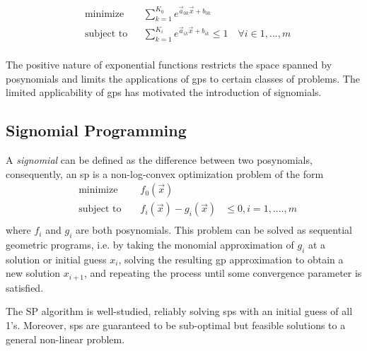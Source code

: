 \begin{equation}
\begin{aligned}
& \text{minimize} && \textstyle{\sum}_{k=1}^{K_0}e^{\vec{a}_{0k}\vec{x} + b_{0k}} \\
& \text{subject to} && \textstyle{\sum}_{k=1}^{K_i}e^{\vec{a}_{ik}\vec{x} + b_{ik}} \leq 1 \quad \forall i \in 1,...,m\\
\end{aligned}
\label{GP_inequality}
\end{equation}


The positive nature of exponential functions restricts the space spanned by posynomials and limits the applications of \gls{gp}s to certain classes of problems. The limited applicability of \gls{gp}s has motivated the introduction of signomials.
\subsection{Signomial Programming}

A {\em signomial} can be defined as the difference between two posynomials, consequently, an \gls{sp} is a non-log-convex optimization problem of the form
\begin{equation}
\begin{aligned}
&\text{minimize } && f_{0}(\vec{x}) \\
&\text{subject to } && f_{i}(\vec{x}) - g_{i}(\vec{x})& \leq 0, i = 1, ...., m \\
\end{aligned}
\end{equation} 
where $f_{i}$ and $g_{i}$ are both posynomials. This problem can be solved as sequential geometric programs, i.e. by taking the monomial approximation of $g_{i}$ at a solution or initial guess $x_{i}$, solving the resulting \gls{gp} approximation to obtain a new solution $x_{i+1}$, and repeating the process until some convergence parameter is satisfied.

The SP algorithm is well-studied, reliably solving \gls{sp}s with an initial guess of all 1’s. Moreover, \gls{sp}s are guaranteed to be sub-optimal but feasible solutions to a general non-linear problem.